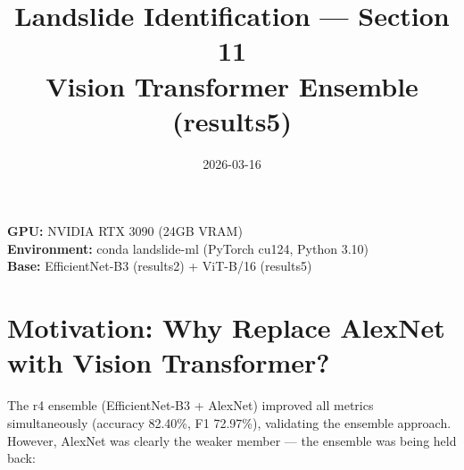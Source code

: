 \documentclass[11pt]{article}
\title{Landslide Identification — Section 11 \\ \large Vision Transformer Ensemble (results5)}
\author{}
\date{2026-03-16}
\begin{document}
\maketitle

\noindent\textbf{GPU:} NVIDIA RTX 3090 (24GB VRAM) \\
\textbf{Environment:} conda landslide-ml (PyTorch cu124, Python 3.10) \\
\textbf{Base:} EfficientNet-B3 (results2) + ViT-B/16 (results5) 

\section{Motivation: Why Replace AlexNet with Vision Transformer?}

The r4 ensemble (EfficientNet-B3 + AlexNet) improved all metrics simultaneously (accuracy 82.40\%, F1 72.97\%), validating the ensemble approach. However, AlexNet was clearly the weaker member --- the ensemble was being held back:
\end{document}
